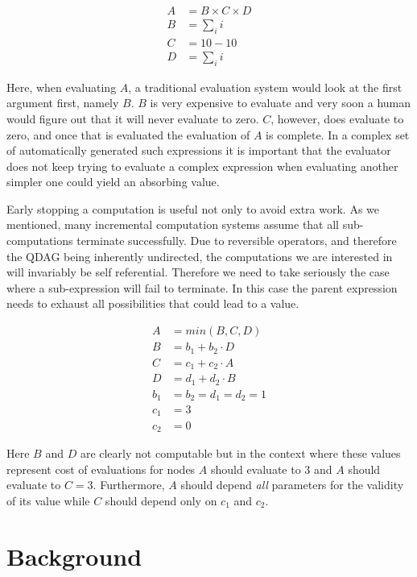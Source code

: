 \begin{align*}
A &= B \times C \times D \\
B &= \sum_i{i} \\
C &= 10 - 10 \\
D &= \sum_i{i}
\end{align*}

Here, when evaluating \(A\), a traditional evaluation system would
look at the first argument first, namely \(B\). \(B\) is very
expensive to evaluate and very soon a human would figure out that it
will never evaluate to zero. \(C\), however, does evaluate to zero,
and once that is evaluated the evaluation of \(A\) is complete. In a
complex set of automatically generated such expressions it is
important that the evaluator does not keep trying to evaluate a
complex expression when evaluating another simpler one could yield an
absorbing value.

Early stopping a computation is useful not only to avoid extra
work. As we mentioned, many incremental computation systems assume
that all sub-computations terminate successfully. Due to reversible
operators, and therefore the QDAG being inherently undirected, the
computations we are interested in will invariably be self
referential. Therefore we need to take seriously the case where a
sub-expression will fail to terminate. In this case the parent
expression needs to exhaust all possibilities that could lead to a
value.

\begin{align*}
A &= min(B, C, D) \\
B &= b_1 + b_2 \cdot D \\
C &= c_1 + c_2 \cdot A \\
D &= d_1 + d_2 \cdot B \\
b_1 &= b_2 = d_1 = d_2 = 1 \\
c_1 &= 3 \\
c_2 &= 0
\end{align*}

Here \(B\) and \(D\) are clearly not computable but in the context
where these values represent cost of evaluations for nodes \(A\)
should evaluate to 3 and \(A\) should evaluate to \(C =
3\). Furthermore, \(A\) should depend \emph{all} parameters for the
validity of its value while \(C\) should depend only on \(c_1\) and
\(c_2\).


\section{Background}

